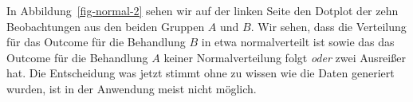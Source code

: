 \documentclass[
  letterpaper,
]{scrbook}
\begin{document}
In Abbildung~\ref{fig-normal-2} sehen wir auf der linken Seite den
Dotplot der zehn Beobachtungen aus den beiden Gruppen \(A\) und \(B\).
Wir sehen, dass die Verteilung für das Outcome für die Behandlung \(B\)
in etwa normalverteilt ist sowie das das Outcome für die Behandlung
\(A\) keiner Normalverteilung folgt \emph{oder} zwei Ausreißer hat. Die
Entscheidung was jetzt stimmt ohne zu wissen wie die Daten generiert
wurden, ist in der Anwendung meist nicht möglich.

\begin{figure}

\begin{minipage}[t]{0.50\linewidth}

{\centering 


}

\end{minipage}%
%
\begin{minipage}[t]{0.50\linewidth}

{\centering 

\raisebox{-\height}{

}}
\end{minipage}
\end{figure}
\end{document}
